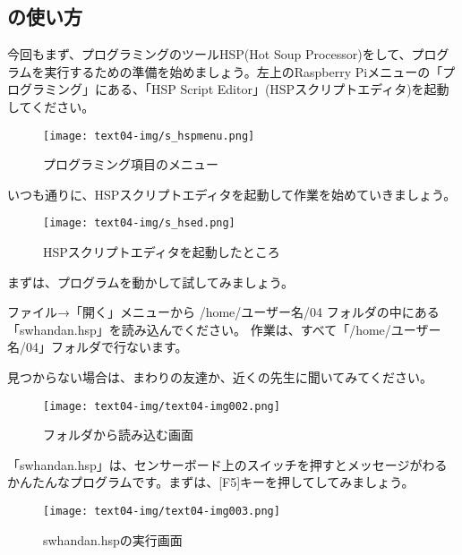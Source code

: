 \newpage
\subsection{の使い方}

今回もまず、プログラミングのツールHSP(Hot Soup Processor)をして、プログラムを実行するための準備を始めましょう。左上のRaspberry Piメニューの「プログラミング」にある、「HSP Script Editor」(HSPスクリプトエディタ)を起動してください。


\begin{figure}[H]
    \begin{center}
      \texttt{[image: text04-img/s\_hspmenu.png]}
      \caption{プログラミング項目のメニュー}
    \end{center}
\end{figure}


いつも通りに、HSPスクリプトエディタを起動して作業を始めていきましょう。

\begin{figure}[H]
    \begin{center}
      \texttt{[image: text04-img/s\_hsed.png]}
      \caption{HSPスクリプトエディタを起動したところ}
    \end{center}
    \label{fig:prog_menu}
\end{figure}
\clearpage



まずは、プログラムを動かして試してみましょう。

ファイル→「開く」メニューから /home/ユーザー名/04 フォルダの中にある「swhandan.hsp」を読み込んでください。
作業は、すべて「/home/ユーザー名/04」フォルダで行ないます。

見つからない場合は、まわりの友達か、近くの先生に聞いてみてください。


\begin{figure}[H]
    \begin{center}
      \texttt{[image: text04-img/text04-img002.png]}
      \caption{フォルダから読み込む画面}
    \end{center}
    \label{fig:prog_menu}
\end{figure}


「swhandan.hsp」は、センサーボード上のスイッチを押すとメッセージがわるかんたんなプログラムです。まずは、[F5]キーを押してしてみましょう。


\begin{figure}[H]
    \begin{center}
      \texttt{[image: text04-img/text04-img003.png]}
      \caption{swhandan.hspの実行画面}
    \end{center}
    \label{fig:prog_menu}
\end{figure}


